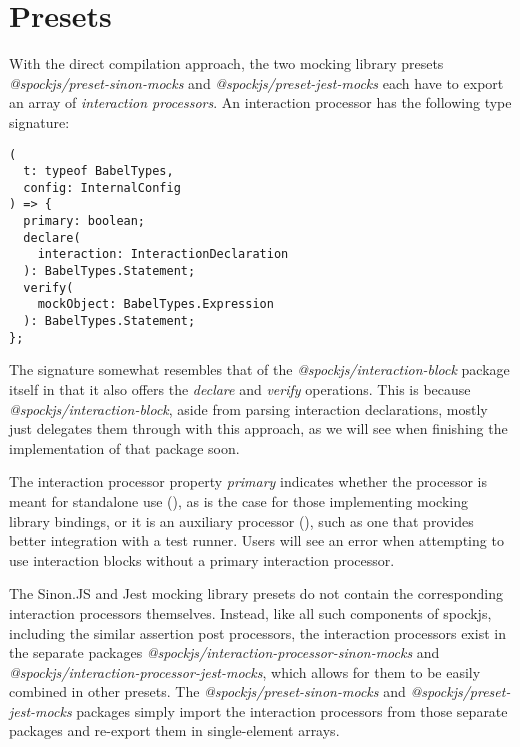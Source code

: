 \section{Presets}
With the direct compilation approach,
the two mocking library presets
\textit{@spockjs/preset-sinon-mocks} and
\textit{@spockjs/preset-jest-mocks}
each have to export an array of
\textit{interaction processors}.
An interaction processor has the following type signature:
\begin{verbatim}
(
  t: typeof BabelTypes,
  config: InternalConfig
) => {
  primary: boolean;
  declare(
    interaction: InteractionDeclaration
  ): BabelTypes.Statement;
  verify(
    mockObject: BabelTypes.Expression
  ): BabelTypes.Statement;
};
\end{verbatim}

The signature somewhat resembles that of
the \textit{@spockjs/interaction-block} package itself
in that it also offers the
\textit{declare} and \textit{verify} operations.
This is because \textit{@spockjs/interaction-block},
aside from parsing interaction declarations,
mostly just delegates them through with this approach,
as we will see when finishing the implementation of that package soon.

The interaction processor property \textit{primary} indicates
whether the processor is meant for standalone use (),
as is the case for those implementing mocking library bindings,
or it is an auxiliary processor (),
such as one that provides better integration with a test runner.
Users will see an error when attempting to use interaction blocks
without a primary interaction processor.

The Sinon.JS and Jest mocking library presets
do not contain the corresponding interaction processors themselves.
Instead, like all such components of spockjs,
including the similar assertion post processors,
the interaction processors exist in the separate packages
\textit{@spockjs/interaction-processor-sinon-mocks} and
\textit{@spockjs/interaction-processor-jest-mocks},
which allows for them to be easily combined in other presets.
The \textit{@spockjs/preset-sinon-mocks} and
\textit{@spockjs/preset-jest-mocks} packages
simply import the interaction processors from those separate packages
and re-export them in single-element arrays.
